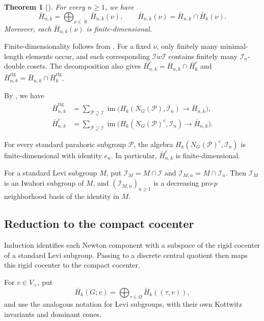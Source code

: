 \documentclass[11pt,letterpaper]{amsart}
\newtheorem{theorem}{Theorem}
\theoremstyle{definition}
\numberwithin{equation}{section}
\numberwithin{theorem}{section}
\let\ge\geqslant
\newcommand{\kk}{k}
\newcommand{\CI}{\mathcal I}
\newcommand{\rig}{\mathrm{rig}}
\DeclareMathOperator{\im}{im}
\begin{document}
\begin{theorem}[{\cite[Theorem~11]{HeI}}]
\label{thm:level-newton-decomposition}
For every $n\ge1$, we have
\[
 \bar H_{n,\kk}
   =\bigoplus_{\nu\in\aleph}\bar H_{n,\kk}(\nu),
 \qquad
 \bar H_{n,\kk}(\nu)=\bar H_{n,\kk}\cap\bar H_\kk(\nu).
\]
Moreover, each $\bar H_{n,\kk}(\nu)$ is finite-dimensional.
\end{theorem}

Finite-dimensionality follows from \cite[Corollary~9 and
Theorem~11(2)]{HeI}. For a fixed $\nu$, only finitely many
minimal-length elements occur, and each corresponding
$\CI\dot w\CI$ contains finitely many $\CI_n$-double cosets.
The decomposition also gives
$\bar H_{n,\kk}^c=\bar H_{n,\kk}\cap\bar H_\kk^c$ and
$\bar H_{n,\kk}^{\rig}=\bar H_{n,\kk}\cap\bar H_\kk^{\rig}$.

By \cite[Theorem~11(2) and Proposition~21]{HeI}, we have
\[
 \begin{aligned}
 \bar H_{n,\kk}^{\rig}
   &=\sum_{\mathcal P\supseteq\CI}
       \im\bigl(
         H_\kk(N_G(\mathcal P),\CI_n)
         \to\bar H_{n,\kk}
       \bigr),\\
 \bar H_{n,\kk}^c
   &=\sum_{\mathcal P\supseteq\CI}
       \im\bigl(
         H_\kk(N_G(\mathcal P)^c,\CI_n)
         \to\bar H_{n,\kk}
       \bigr).
 \end{aligned}
\]

For every standard parahoric subgroup $\mathcal P$,
the algebra $H_\kk(N_G(\mathcal P)^c,\CI_n)$ is
finite-dimensional with identity $e_n$. In particular, $\bar H_{n,\kk}^c$ is finite-dimensional.

For a standard Levi subgroup $M$, put $\CI_M=M\cap\CI$ and
$\CI_{M,n}=M\cap\CI_n$. Then $\CI_M$ is an Iwahori subgroup
of $M$, and $(\CI_{M,n})_{n\ge1}$ is a decreasing pro-$p$
neighborhood basis of the identity in $M$.

\subsection{Reduction to the compact cocenter}
\label{subsec:newton-induction}

Induction identifies each Newton component with a subspace of the rigid cocenter of a standard Levi subgroup. Passing to a discrete central quotient then maps this rigid cocenter to the compact cocenter.

For $v\in V_+$, put
\[
 \bar H_\kk(G;v)
   =\bigoplus_{\tau\in\Omega}\bar H_\kk((\tau,v)),
\]
and use the analogous notation for Levi subgroups, with their own Kottwitz invariants and dominant cones.
\end{document}
